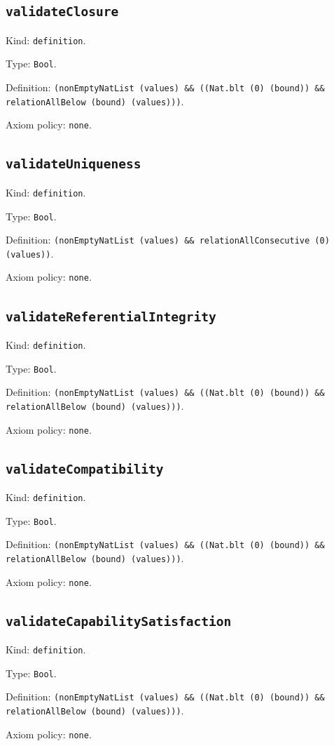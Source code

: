 \documentclass[11pt]{article}
\begin{document}
\subsection*{\texttt{validateClosure}}
\noindent Kind: \texttt{definition}.\par
\noindent Type: \texttt{Bool}.\par
\noindent Definition: \texttt{(nonEmptyNatList (values) \&\& ((Nat.blt (0) (bound)) \&\& relationAllBelow (bound) (values)))}.\par
\noindent Axiom policy: \texttt{none}.\par
\subsection*{\texttt{validateUniqueness}}
\noindent Kind: \texttt{definition}.\par
\noindent Type: \texttt{Bool}.\par
\noindent Definition: \texttt{(nonEmptyNatList (values) \&\& relationAllConsecutive (0) (values))}.\par
\noindent Axiom policy: \texttt{none}.\par
\subsection*{\texttt{validateReferentialIntegrity}}
\noindent Kind: \texttt{definition}.\par
\noindent Type: \texttt{Bool}.\par
\noindent Definition: \texttt{(nonEmptyNatList (values) \&\& ((Nat.blt (0) (bound)) \&\& relationAllBelow (bound) (values)))}.\par
\noindent Axiom policy: \texttt{none}.\par
\subsection*{\texttt{validateCompatibility}}
\noindent Kind: \texttt{definition}.\par
\noindent Type: \texttt{Bool}.\par
\noindent Definition: \texttt{(nonEmptyNatList (values) \&\& ((Nat.blt (0) (bound)) \&\& relationAllBelow (bound) (values)))}.\par
\noindent Axiom policy: \texttt{none}.\par
\subsection*{\texttt{validateCapabilitySatisfaction}}
\noindent Kind: \texttt{definition}.\par
\noindent Type: \texttt{Bool}.\par
\noindent Definition: \texttt{(nonEmptyNatList (values) \&\& ((Nat.blt (0) (bound)) \&\& relationAllBelow (bound) (values)))}.\par
\noindent Axiom policy: \texttt{none}.\par
\end{document}
